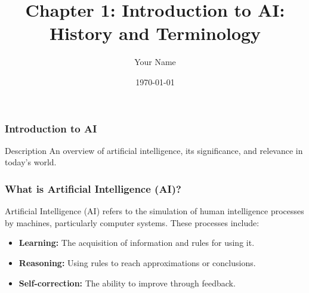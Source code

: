 \documentclass{beamer}
\title{Chapter 1: Introduction to AI: History and Terminology}
\author{Your Name}
\institute{Your Institution}
\date{\today}
\begin{document}
\frame{\titlepage}

\begin{frame}[fragile]
    \frametitle{Introduction to AI}
    \begin{block}{Description}
        An overview of artificial intelligence, its significance, and relevance in today's world.
    \end{block}
\end{frame}

\begin{frame}[fragile]
    \frametitle{What is Artificial Intelligence (AI)?}
    Artificial Intelligence (AI) refers to the simulation of human intelligence processes by machines, particularly computer systems. These processes include:
    \begin{itemize}
        \item \textbf{Learning:} The acquisition of information and rules for using it.
        \item \textbf{Reasoning:} Using rules to reach approximations or conclusions.
        \item \textbf{Self-correction:} The ability to improve through feedback.
    \end{itemize}
\end{frame}
\end{document}
